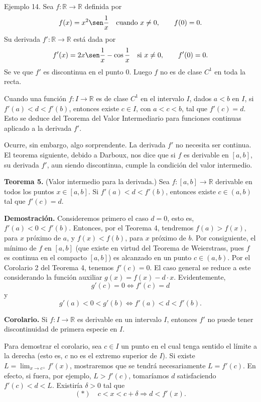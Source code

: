 \documentclass[12pt,oneside]{book}
\begin{document}
Ejemplo 14. Sea \( f: \mathbb{R} \to \mathbb{R} \) definida por
\[
f(x) = x^2 \sen \frac{1}{x} \quad \text{cuando } x \neq 0, \qquad f(0) = 0.
\]
Su derivada \( f': \mathbb{R} \to \mathbb{R} \) está dada por
\[
f'(x) = 2x \sen \frac{1}{x} - \cos \frac{1}{x} \quad \text{si } x \neq 0, \qquad f'(0) = 0.
\]
Se ve que \( f' \) es discontinua en el punto \( 0 \). Luego \( f \) no es de clase \( C^1 \) en toda la recta.

Cuando una función \( f: I \to \mathbb{R} \) es de clase \( C^1 \) en el intervalo \( I \), dados \( a < b \) en \( I \), si \( f'(a) < d < f'(b) \), entonces existe \( c \in I \), con \( a < c < b \), tal que \( f'(c) = d \). Esto se deduce del Teorema del Valor Intermediario para funciones continuas aplicado a la derivada \( f' \).

Ocurre, sin embargo, algo sorprendente. La derivada \( f' \) no necesita ser continua. El teorema siguiente, debido a Darboux, nos dice que si \( f \) es derivable en \( [a, b] \), su derivada \( f' \), aun siendo discontinua, cumple la condición del valor intermedio.

\textbf{Teorema 5.} (Valor intermedio para la derivada.) Sea \( f: [a, b] \to \mathbb{R} \) derivable en todos los puntos \( x \in [a, b] \). Si \( f'(a) < d < f'(b) \), entonces existe \( c \in (a, b) \) tal que \( f'(c) = d \).

\textbf{Demostración.} Consideremos primero el caso \( d = 0 \), esto es, \( f'(a) < 0 < f'(b) \). Entonces, por el Teorema 4, tendremos \( f(a) > f(x) \), para \( x \) próximo de \( a \), y \( f(x) < f(b) \), para \( x \) próximo de \( b \). Por consiguiente, el mínimo de \( f \) en \( [a, b] \) (que existe en virtud del Teorema de Weierstrass, pues \( f \) es continua en el compacto \( [a, b] \)) es alcanzado en un punto \( c \in (a, b) \). Por el Corolario 2 del Teorema 4, tenemos \( f'(c) = 0 \). El caso general se reduce a este considerando la función auxiliar \( g(x) = f(x) - d \cdot x \). Evidentemente,
\[
g'(c) = 0 \iff f'(c) = d
\]
y
\[
g'(a) < 0 < g'(b) \iff f'(a) < d < f'(b).
\]

\textbf{Corolario.} Si \( f: I \to \mathbb{R} \) es derivable en un intervalo \( I \), entonces \( f' \) no puede tener discontinuidad de primera especie en \( I \).

Para demostrar el corolario, sea \( c \in I \) un punto en el cual tenga sentido el límite a la derecha (esto es, \( c \) no es el extremo superior de \( I \)). Si existe \( L = \lim_{x \to c^+} f'(x) \), mostraremos que se tendrá necesariamente \( L = f'(c) \). En efecto, si fuera, por ejemplo, \( L > f'(c) \), tomaríamos \( d \) satisfaciendo \( f'(c) < d < L \). Existiría \( \delta > 0 \) tal que
\[
(*) \quad c < x < c + \delta \Rightarrow d < f'(x).
\]
\end{document}
